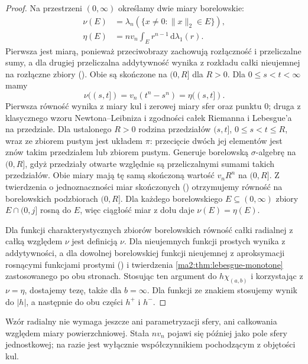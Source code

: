\begin{proof}
Na przestrzeni $(0,\infty)$ określamy dwie miary
borelowskie:
\[
 \begin{aligned}
 \nu(E)&=\lambda_n(\{x\ne0:\|x\|_2\in E\}),\\
 \eta(E)&=nv_n\int_E r^{n-1}\,\mathrm d\lambda_1(r).
 \end{aligned}
\]
Pierwsza jest miarą, ponieważ przeciwobrazy
zachowują rozłączność i przeliczalne sumy,
a dla drugiej przeliczalna addytywność wynika
z rozkładu całki nieujemnej na rozłączne zbiory
(). Obie są skończone
na $(0,R]$ dla $R>0$.
Dla $0\le s<t<\infty$ mamy
\[
 \nu((s,t])=v_n(t^n-s^n)=\eta((s,t]).
\]
Pierwsza równość wynika z miary kul i zerowej
miary sfer oraz punktu $0$; druga z klasycznego
wzoru Newtona--Leibniza i zgodności całek
Riemanna i Lebesgue'a na przedziale.
Dla ustalonego $R>0$ rodzina przedziałów
$(s,t]$, $0\le s<t\le R$, wraz ze zbiorem
pustym jest układem $\pi$: przecięcie dwóch
jej elementów jest znów takim przedziałem
lub zbiorem pustym. Generuje borelowską
$\sigma$-algebrę na $(0,R]$, gdyż przedziały otwarte
względnie są przeliczalnymi sumami takich
przedziałów. Obie miary mają tę samą
skończoną wartość $v_nR^n$ na $(0,R]$.
Z twierdzenia o jednoznaczności miar skończonych
()
otrzymujemy równość na borelowskich podzbiorach
$(0,R]$. Dla każdego borelowskiego $E\subseteq
(0,\infty)$ zbiory $E\cap(0,j]$ rosną do $E$,
więc ciągłość miar z dołu daje $\nu(E)=\eta(E)$.

Dla funkcji charakterystycznych zbiorów
borelowskich równość całki radialnej z całką
względem $\nu$ jest definicją $\nu$.
Dla nieujemnych funkcji prostych wynika
z addytywności, a dla dowolnej borelowskiej
funkcji nieujemnej z aproksymacji rosnącymi
funkcjami prostymi
()
i twierdzenia \ref{ma2:thm:lebesgue-monotone}
zastosowanego po obu stronach.
Stosując ten argument do
$h\chi_{(a,b)}$ i korzystając z $\nu=\eta$,
dostajemy tezę, także dla $b=\infty$.
Dla funkcji ze znakiem stosujemy wynik
do $|h|$, a następnie do obu części $h^+$ i $h^-$.
\end{proof}

Wzór radialny nie wymaga jeszcze ani
parametryzacji sfery, ani całkowania
względem miary powierzchniowej. Stała $nv_n$
pojawi się później jako pole sfery jednostkowej;
na razie jest wyłącznie współczynnikiem
pochodzącym z objętości kul.

